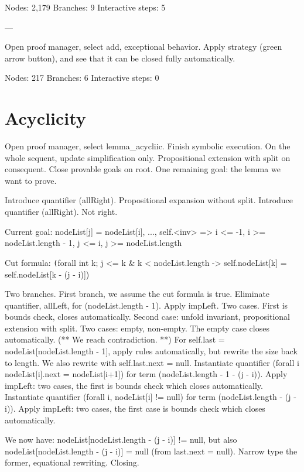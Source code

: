 Nodes: 2,179
Branches: 9
Interactive steps: 5

---

Open proof manager, select add, exceptional behavior. Apply strategy (green arrow button), and see that it can be closed fully automatically.

Nodes: 217
Branches: 6
Interactive steps: 0

\section{Acyclicity}\label{sec:acyclicity}

Open proof manager, select lemma\_acycliic. Finish symbolic execution. On the whole sequent, update simplification only. Propositional extension with split on consequent. Close provable goals on root. One remaining goal: the lemma we want to prove.

Introduce quantifier (allRight). Propositional expansion without split. Introduce quantifier (allRight). Not right.

Current goal:
nodeList[j] = nodeList[i], ..., self.<inv> => i <= -1, i >= nodeList.length - 1, j <= i, j >= nodeList.length

Cut formula:
\texttt(forall int k; j <= k \& k < nodeList.length -> self.nodeList[k] = self.nodeList[k - (j - i)])

Two branches. First branch, we assume the cut formula is true. Eliminate quantifier, allLeft, for (nodeList.length - 1). Apply impLeft. Two cases. First is bounds check, closes automatically. Second case: unfold invariant, propositional extension with split. Two cases: empty, non-empty. The empty case closes automatically. (** We reach contradiction. **) For self.last = nodeList[nodeList.length - 1], apply rules automatically, but rewrite the size back to length. We also rewrite with self.last.next = null. Instantiate quantifier (forall i nodeList[i].next = nodeList[i+1]) for term (nodeList.length - 1 - (j - i)). Apply impLeft: two cases, the first is bounds check which closes automatically. Instantiate quantifier (forall i, nodeList[i] != null) for term (nodeList.length - (j - i)). Apply impLeft: two cases, the first case is bounds check which closes automatically.

We now have: nodeList[nodeList.length - (j - i)] != null, but also nodeList[nodeList.length - (j - i)] = null (from last.next = null). Narrow type the former, equational rewriting. Closing.